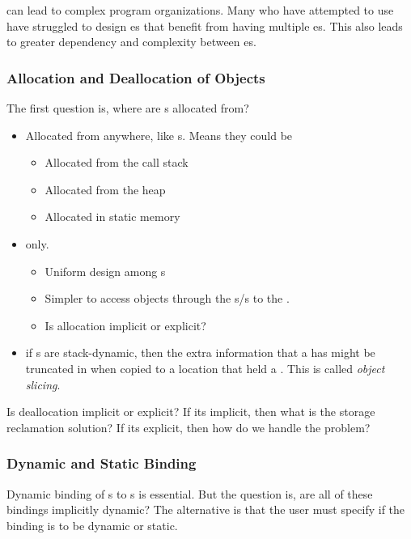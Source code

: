  can lead to complex program organizations.
Many who have attempted to use  have struggled to design es that benefit from having multiple es.
This also leads to greater dependency and complexity between es.

\subsubsection{Allocation and Deallocation of Objects}\label{subsubsec:OOP_Object_Allocation_Deallocation}
The first question is, where are s allocated from?
\begin{itemize}[noitemsep]
\item Allocated from anywhere, like s. Means they could be
  \begin{itemize}[noitemsep]
  \item Allocated from the call stack
  \item Allocated from the heap
  \item Allocated in static memory
  \end{itemize}
\item {} only.
  \begin{itemize}[noitemsep]
  \item Uniform design among s
  \item Simpler to access objects through the s/s to the .
  \item Is allocation implicit or explicit?
  \end{itemize}
\item if s are stack-dynamic, then the extra information that a  has might be truncated in  when copied to a location that held a . This is called \emph{object slicing}.
\end{itemize}

Is deallocation implicit or explicit?
If its implicit, then what is the storage reclamation solution?
If its explicit, then how do we handle the  problem?

\subsubsection{Dynamic and Static Binding}\label{subsubsec:OOP_Dynamic_Static_Binding}
Dynamic binding of s to s is essential.
But the question is, are all of these bindings implicitly dynamic?
The alternative is that the user must specify if the binding is to be dynamic or static.

